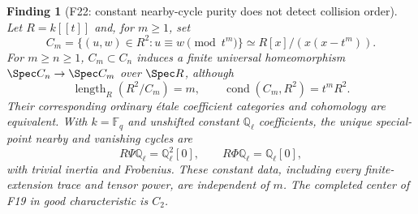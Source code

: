 \documentclass[11pt,a4paper]{article}
\newcommand{\Q}{\mathbb Q}\newcommand{\Z}{\mathbb Z}\newcommand{\C}{\mathbb C}\newcommand{\N}{\mathbb N}\newcommand{\F}{\mathbb F}
\newcommand{\fid}[1]{\textsf{#1}}\newcommand{\gate}[1]{\textsf{#1}}
\theoremstyle{named}\newtheorem{finding}{Finding}[section]
\theoremstyle{definition}\newtheorem{definition}[finding]{Definition}
\theoremstyle{remark}\newtheorem{remark}[finding]{Remark}
\begin{document}
\begin{finding}[\fid{F22}: constant nearby-cycle purity does not detect collision order]\label{f:collision}
Let $R=k[[t]]$ and, for $m\ge1$, set
\[
 C_m=\{(u,w)\in R^2:u\equiv w\pmod{t^m}\}
     \simeq R[x]/(x(x-t^m)).
\]
For $m\ge n\ge1$, $C_m\subset C_n$ induces a finite universal
homeomorphism $\Spec C_n\to\Spec C_m$ over $\Spec R$, although
\[
 \operatorname{length}_R(R^2/C_m)=m,\qquad
 \operatorname{cond}(C_m,R^2)=t^mR^2.
\]
Their corresponding ordinary \'etale coefficient categories and
cohomology are equivalent. With $k=\F_q$ and unshifted constant
$\Q_\ell$ coefficients, the unique special-point nearby and vanishing
cycles are
\[
 R\Psi\Q_\ell=\Q_\ell^2[0],\qquad
 R\Phi\Q_\ell=\Q_\ell[0],
\]
with trivial inertia and Frobenius. These constant data, including every
finite-extension trace and tensor power, are independent of $m$.
The completed center of \fid{F19} in good characteristic is $C_2$.
\end{finding}
\end{document}
